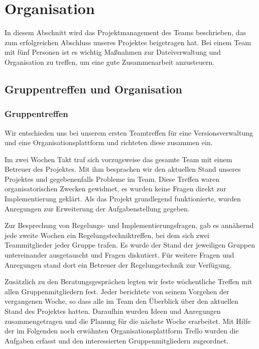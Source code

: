 \section{Organisation}
\label{cha:Organisation}
In diesem Abschnitt wird das Projektmanagement des Teams beschrieben, das zum erfolgreichen Abschluss unseres Projektes beigetragen hat. Bei einem Team mit fünf Personen ist es wichtig Maßnahmen zur Dateiverwaltung und Organisation zu treffen, um eine gute Zusammenarbeit anzusteuern.

\subsection{Gruppentreffen und Organisation}
\label{sec:gruppentreffenundorganisation}
\subsubsection{Gruppentreffen}
Wir entschieden uns bei unserem ersten Teamtreffen für eine Versionsverwaltung und eine Organisationsplattform und richteten diese zusammen ein.

Im zwei Wochen Takt traf sich vorzugsweise das gesamte Team mit einem Betreuer des Projektes. Mit ihm besprachen wir den aktuellen Stand unseres Projektes und gegebenenfalls Probleme im Team. Diese Treffen waren organisatorischen Zwecken gewidmet, es wurden keine Fragen direkt zur Implementierung geklärt. Als das Projekt grundlegend funktionierte, wurden Anregungen zur Erweiterung der Aufgabenstellung gegeben. 

Zur Besprechung von Regelungs- und Implementierungsfragen, gab es annähernd jede zweite Wochen ein Regelungstechniktreffen, bei dem sich zwei Teammitglieder jeder Gruppe trafen. Es wurde der Stand der jeweiligen Gruppen untereinander ausgetauscht und Fragen diskutiert. Für weitere Fragen und Anregungen stand dort ein Betreuer der Regelungstechnik zur Verfügung.

Zusätzlich zu den Beratungsgesprächen legten wir feste wöchentliche Treffen mit allen Gruppenmitgliedern fest. Jeder berichtete von seinem Vorgehen der vergangenen Woche, so dass alle im Team den Überblick über den aktuellen Stand des Projektes hatten. Daraufhin wurden Ideen und Anregungen zusammengetragen und die Planung für die nächste Woche erarbeitet. Mit Hilfe der im Folgenden noch erwähnten Organisationsplattform Trello wurden die Aufgaben erfasst und den interessierten Gruppenmitgliedern zugeordnet. 


